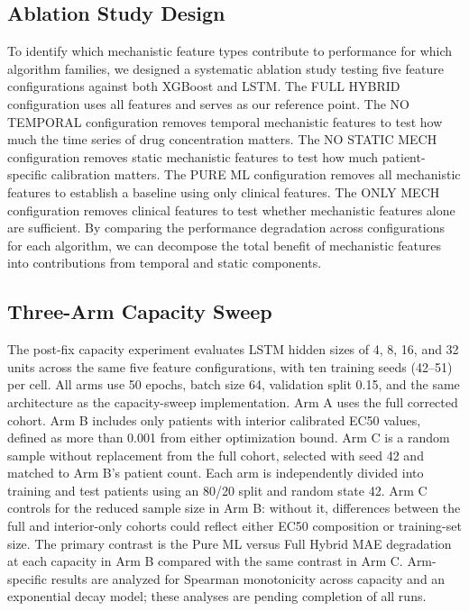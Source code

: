 \documentclass[11pt,a4paper]{article}
\begin{document}
\subsection{Ablation Study Design}

To identify which mechanistic feature types contribute to performance for which algorithm families, we designed a systematic ablation study testing five feature configurations against both XGBoost and LSTM. The FULL HYBRID configuration uses all features and serves as our reference point. The NO TEMPORAL configuration removes temporal mechanistic features to test how much the time series of drug concentration matters. The NO STATIC MECH configuration removes static mechanistic features to test how much patient-specific calibration matters. The PURE ML configuration removes all mechanistic features to establish a baseline using only clinical features. The ONLY MECH configuration removes clinical features to test whether mechanistic features alone are sufficient. By comparing the performance degradation across configurations for each algorithm, we can decompose the total benefit of mechanistic features into contributions from temporal and static components.

\subsection{Three-Arm Capacity Sweep}

The post-fix capacity experiment evaluates LSTM hidden sizes of 4, 8, 16, and 32 units across the same five feature configurations, with ten training seeds (42--51) per cell. All arms use 50 epochs, batch size 64, validation split 0.15, and the same architecture as the capacity-sweep implementation. Arm A uses the full corrected cohort. Arm B includes only patients with interior calibrated EC50 values, defined as more than 0.001 from either optimization bound. Arm C is a random sample without replacement from the full cohort, selected with seed 42 and matched to Arm B's patient count. Each arm is independently divided into training and test patients using an 80/20 split and random state 42. Arm C controls for the reduced sample size in Arm B: without it, differences between the full and interior-only cohorts could reflect either EC50 composition or training-set size. The primary contrast is the Pure ML versus Full Hybrid MAE degradation at each capacity in Arm B compared with the same contrast in Arm C. Arm-specific results are analyzed for Spearman monotonicity across capacity and an exponential decay model; these analyses are pending completion of all runs.
\end{document}
